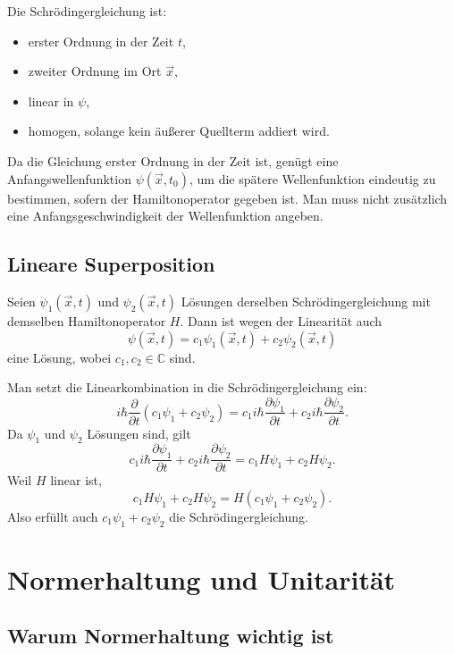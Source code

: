 Die Schrödingergleichung ist:
\begin{itemize}
    \item erster Ordnung in der Zeit $t$,
    \item zweiter Ordnung im Ort $\vec{x}$,
    \item linear in $\psi$,
    \item homogen, solange kein äußerer Quellterm addiert wird.
\end{itemize}

\begin{conceptbox}
Da die Gleichung erster Ordnung in der Zeit ist, genügt eine Anfangswellenfunktion $\psi(\vec{x},t_0)$, um die spätere Wellenfunktion eindeutig zu bestimmen, sofern der Hamiltonoperator gegeben ist. Man muss nicht zusätzlich eine Anfangsgeschwindigkeit der Wellenfunktion angeben.
\end{conceptbox}

\subsection{Lineare Superposition}

Seien $\psi_1(\vec{x},t)$ und $\psi_2(\vec{x},t)$ Lösungen derselben Schrödingergleichung mit demselben Hamiltonoperator $H$. Dann ist wegen der Linearität auch
\[
    \psi(\vec{x},t)
    =c_1\psi_1(\vec{x},t)+c_2\psi_2(\vec{x},t)
\]
eine Lösung, wobei $c_1,c_2\in\mathbb{C}$ sind.

\begin{derivationbox}
Man setzt die Linearkombination in die Schrödingergleichung ein:
\[
    i\hbar\frac{\partial}{\partial t}(c_1\psi_1+c_2\psi_2)
    =c_1 i\hbar\frac{\partial \psi_1}{\partial t}
     +c_2 i\hbar\frac{\partial \psi_2}{\partial t}.
\]
Da $\psi_1$ und $\psi_2$ Lösungen sind, gilt
\[
    c_1 i\hbar\frac{\partial \psi_1}{\partial t}
     +c_2 i\hbar\frac{\partial \psi_2}{\partial t}
    =c_1 H\psi_1+c_2H\psi_2.
\]
Weil $H$ linear ist,
\[
    c_1 H\psi_1+c_2H\psi_2
    =H(c_1\psi_1+c_2\psi_2).
\]
Also erfüllt auch $c_1\psi_1+c_2\psi_2$ die Schrödingergleichung.
\end{derivationbox}

\section{Normerhaltung und Unitarität}

\subsection{Warum Normerhaltung wichtig ist}

